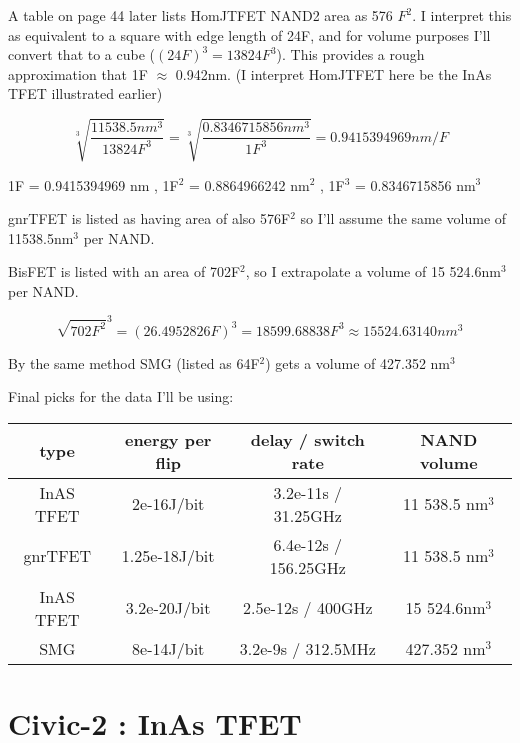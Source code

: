 \documentclass[a4paper]{article}
\begin{document}
	\medskip
	
	A table on page 44 later lists HomJTFET NAND2 area as 576 $F^2$. I interpret this as equivalent to a square with edge length of 24F, and for volume purposes I'll convert that to a cube ($(24F)^3 = 13824F^3$). This provides a rough approximation that 1F $\approx$ 0.942nm. (I interpret HomJTFET here be the InAs TFET illustrated earlier)
	
	$$ \sqrt[3]{\frac{11 538.5nm^3}{13824F^3}} = \sqrt[3]{\frac{0.8346715856 nm^3}{1F^3}} = 0.9415394969 nm/F$$
	
	1F = 0.9415394969 nm , 1F$^2$ = 0.8864966242 nm$^2$ , 1F$^3$ = 0.8346715856 nm$^3$
	
	\medskip
	
	gnrTFET is listed as having area of also 576F$^2$ so I'll assume the same volume of 11538.5nm$^3$ per NAND.
	
	\medskip
	
	BisFET is listed with an area of 702F$^2$, so I extrapolate a volume of 15 524.6nm$^3$ per NAND.
	
	$$ \sqrt{702F^2}^3 = (26.4952826F)^3 = 18599.68838F^3 \approx 15 524.63140 nm^3 $$
	
	By the same method SMG (listed as 64F$^2$) gets a volume of 427.352 nm$^3$
	
	\bigskip
	
	Final picks for the data I'll be using:
	
	\begin{center}
		\begin{tabular}{| c | c | c | c |}
			\hline
			type & energy per flip & delay / switch rate & NAND volume \\\hline
			InAS TFET & 2e-16J/bit & 3.2e-11s / 31.25GHz & 11 538.5 nm$^3$ \\\hline
			gnrTFET & 1.25e-18J/bit & 6.4e-12s / 156.25GHz & 11 538.5 nm$^3$ \\\hline
			InAS TFET & 3.2e-20J/bit & 2.5e-12s / 400GHz & 15 524.6nm$^3$ \\\hline
			SMG & 8e-14J/bit & 3.2e-9s / 312.5MHz & 427.352 nm$^3$ \\\hline
		\end{tabular}
	\end{center}
	
	\pagebreak
	
	\section{Civic-2 : InAs TFET}
	
\end{document}
